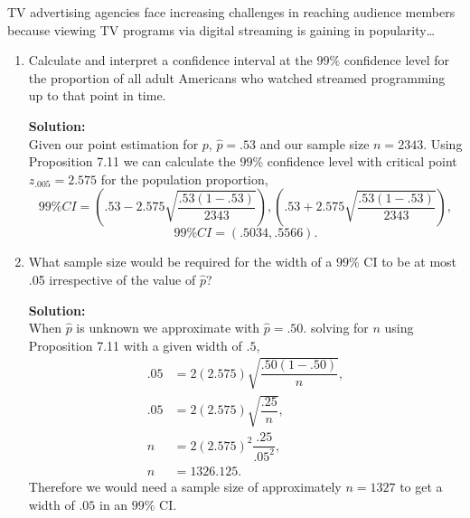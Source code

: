 \documentclass[12pt]{article}
\makeatletter
\theoremstyle{homework}
\newenvironment{exercise}[1]
{\def\@currentlabel{#1}\exercisecore}
{\endexercisecore}
\newcommand{\localhead}[1]{\par\smallskip\noindent\textbf{#1}\nobreak\\}%
\newcommand\solution{\localhead{Solution:}}
\makeatother
\begin{document}
\begin{exercise}{7.20} TV  advertising  agencies  face  increasing  challenges  in 
reaching audience members because viewing TV programs via  digital  streaming  is  gaining  in  popularity\dots\\
\begin{enumerate}
  
  \item Calculate  and  interpret  a  confidence  interval  at  the  $99\%$ confidence level for the proportion 
  of all adult Americans  who  watched  streamed  programming  up  to that point in time.\\
  \solution Given our point estimation for $p$, $\hat{p} = .53$ and our sample size $n = 2343$. Using Proposition 7.11 we can calculate the 
  $99\%$ confidence level with critical point $z_{.005} = 2.575$ for the population proportion,
  \begin{equation*}
    99\% CI = (.53 - 2.575\sqrt{\dfrac{.53(1 - .53)}{2343}}), (.53 + 2.575\sqrt{\dfrac{.53(1 - .53)}{2343}}),
  \end{equation*}
  \begin{equation*}
    99\% CI = (.5034, .5566).
  \end{equation*}
  \vspace{.25in}


  \item What sample size would be required for the
   width of a $99\%$ CI to be at most .05 irrespective of the value of $\hat{p}$?\\

   \solution When $\hat{p}$ is unknown we approximate with $\hat{p} = .50$. solving for $n$ using Proposition 7.11 with 
   a given width of $.5$,
   \begin{align*}
     .05 &= 2(2.575)\sqrt{\dfrac{.50(1 - .50)}{n}},\\
     .05 &= 2(2.575)\sqrt{\dfrac{.25}{n}},\\
     n &= 2(2.575)^2\dfrac{.25}{.05^2},\\
     n &= 1326.125.
   \end{align*}
Therefore we would need a sample size of approximately $n = 1327$ to get a width of $.05$ in an $99\%$ CI.
\end{enumerate}
\end{exercise}
\vspace{.5in}
\end{document}
